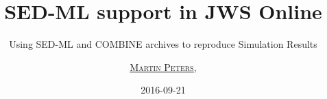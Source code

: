 \usepackage[utf8]{inputenc}
\usepackage{pifont}
\usepackage{arev}
\graphicspath{{../../sems-media/priv/}}

\author[
	\textbf{\href{http://www.sbi.uni-rostock.de/team/single/martin-peters/}{Martin Peters}}
]
{
	\underline{\textsc{\href{http://freakybytes.net}{Martin Peters}}},
}

\date{2016-09-21}



\titlegraphic{
}
\title[SED-ML support in JWS Online]{\Large SED-ML support in JWS Online}
\subtitle{\small Using SED-ML and COMBINE archives to reproduce Simulation Results}


\titleimage{}
\renewcommand{\mylogo}{
}

